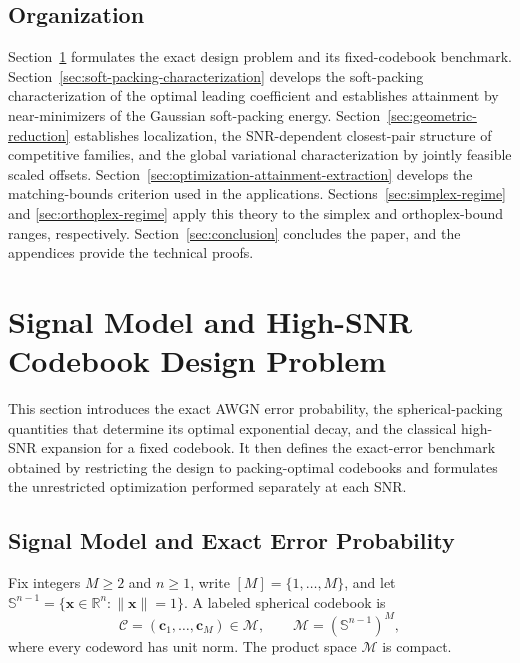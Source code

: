 \documentclass[12pt,draftclsnofoot,onecolumn]{IEEEtran}
\newcommand{\R}{\mathbb{R}}
\newcommand{\Sph}{\mathbb{S}}
\newcommand{\cC}{\mathcal{C}}
\newcommand{\cM}{\mathcal{M}}
\newcommand{\bc}{\bm c}
\newcommand{\bx}{\bm x}
\theoremstyle{definition}
\begin{document}
\subsection{Organization}
\label{subsec:organization}

Section~\ref{sec:signal-packing-fixed} formulates the exact design problem
and its fixed-codebook benchmark.
Section~\ref{sec:soft-packing-characterization} develops the soft-packing
characterization of the optimal leading coefficient and establishes
attainment by near-minimizers of the Gaussian soft-packing energy.
Section~\ref{sec:geometric-reduction} establishes localization, the
SNR-dependent closest-pair structure of competitive families, and the
global variational characterization by jointly feasible scaled offsets.
Section~\ref{sec:optimization-attainment-extraction} develops the
matching-bounds criterion used in the applications.
Sections~\ref{sec:simplex-regime} and \ref{sec:orthoplex-regime} apply
this theory to the simplex and orthoplex-bound ranges, respectively.
Section~\ref{sec:conclusion} concludes the paper, and the
appendices provide the technical proofs.


\section{Signal Model and High-SNR Codebook Design Problem}
\label{sec:signal-packing-fixed}

This section introduces the exact AWGN error probability, the
spherical-packing quantities that determine its optimal exponential
decay, and the classical high-SNR expansion for a fixed codebook.  It
then defines the exact-error benchmark obtained by restricting the design
to packing-optimal codebooks and formulates the unrestricted optimization
performed separately at each SNR.

\subsection{Signal Model and Exact Error Probability}
\label{subsec:awgn-model}

Fix integers \(M\ge2\) and \(n\ge1\), write
\([M]=\{1,\ldots,M\}\), and let
\(\Sph^{n-1}=\{\bx\in\R^n:\|\bx\|=1\}\).
A labeled spherical codebook is
\begin{equation*}
  \cC=(\bc_1,\ldots,\bc_M)\in\cM,
  \qquad
  \cM=(\Sph^{n-1})^M,
\end{equation*}
where every codeword has unit norm.  The product space \(\cM\) is
compact.
\end{document}
